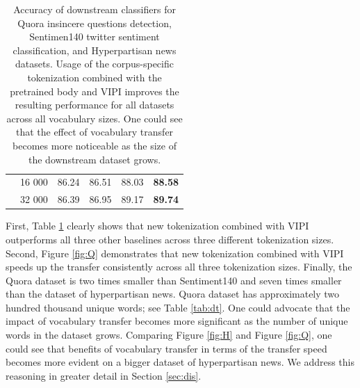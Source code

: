 \documentclass[review]{elsarticle}
\begin{document}
\begin{table}[]
\begin{tabular}{llllll}
                                                                              & 16 000                                                                       & 86.24                                                                                                                  & 86.51                            & 88.03        & \textbf{88.58}       \\
                                                                              & 32 000                                                                       & 86.39                                                                                                                  & 86.95                            & 89.17        & \textbf{89.74}       \\ \hline
\end{tabular}
\caption{Accuracy of downstream classifiers for Quora insincere questions detection, Sentimen140 twitter sentiment classification,  and Hyperpartisan news datasets. Usage of the corpus-specific tokenization combined with the pretrained body and VIPI improves the resulting performance for all datasets across all vocabulary sizes. One could see that the effect of vocabulary transfer becomes more noticeable as the size of the downstream dataset grows.}
  \label{tab:res}
\end{table}

First, Table \ref{tab:res} clearly shows that new tokenization combined with VIPI outperforms all three other baselines across three different tokenization sizes. Second, Figure \ref{fig:Q} demonstrates that new tokenization combined with VIPI speeds up the transfer consistently across all three tokenization sizes. Finally, the Quora dataset is two times smaller than Sentiment140 and seven times smaller than the dataset of hyperpartisan news. Quora dataset has approximately two hundred thousand unique words; see Table \ref{tab:dt}. One could advocate that the impact of vocabulary transfer becomes more significant as the number of unique words in the dataset grows. Comparing Figure \ref{fig:H} and Figure \ref{fig:Q}, one could see that benefits of vocabulary transfer in terms of the transfer speed becomes more evident on a bigger dataset of hyperpartisan news. We address this reasoning in greater detail in Section \ref{sec:dis}.
\end{document}
